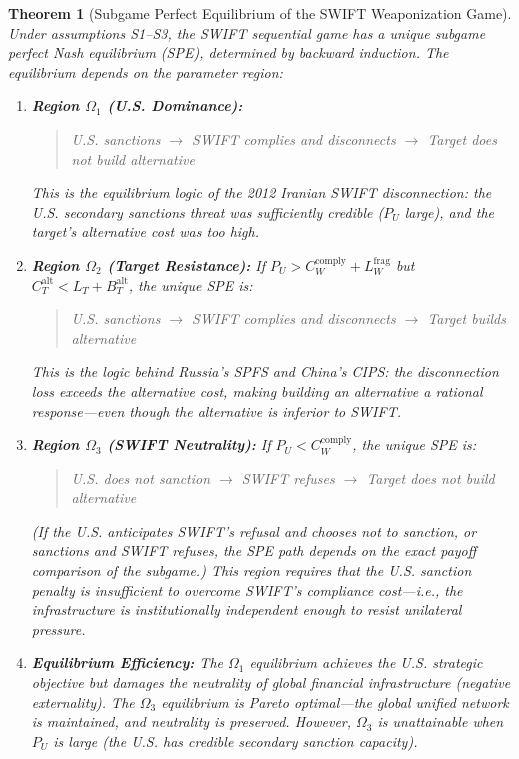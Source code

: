 \documentclass[12pt,a4paper]{ctexart}
\newtheorem{theorem}{Theorem}[section]
\theoremstyle{definition}
\theoremstyle{remark}
\begin{document}
\begin{theorem}[Subgame Perfect Equilibrium of the SWIFT Weaponization Game]
\label{thm:swift-spe}
Under assumptions S1--S3, the SWIFT sequential game has a unique subgame perfect Nash equilibrium (SPE), determined by backward induction. The equilibrium depends on the parameter region:

\begin{enumerate}[label=(
oman*), itemsep=6pt]
\item \textbf{Region $\Omega_1$ (U.S. Dominance):}
\begin{quote}
U.S. sanctions $\to$ SWIFT complies and disconnects $\to$ Target does not build alternative
\end{quote}
This is the equilibrium logic of the 2012 Iranian SWIFT disconnection: the U.S. secondary sanctions threat was sufficiently credible ($P_U$ large), and the target's alternative cost was too high.

\item \textbf{Region $\Omega_2$ (Target Resistance):} If $P_U > C_W^{\text{comply}} + L_W^{\text{frag}}$ but $C_T^{\text{alt}} < L_T + B_T^{\text{alt}}$, the unique SPE is:
\begin{quote}
U.S. sanctions $\to$ SWIFT complies and disconnects $\to$ Target builds alternative
\end{quote}
This is the logic behind Russia's SPFS and China's CIPS: the disconnection loss exceeds the alternative cost, making building an alternative a rational response---even though the alternative is inferior to SWIFT.

\item \textbf{Region $\Omega_3$ (SWIFT Neutrality):} If $P_U < C_W^{\text{comply}}$, the unique SPE is:
\begin{quote}
U.S. does not sanction $\to$ SWIFT refuses $\to$ Target does not build alternative
\end{quote}
(If the U.S. anticipates SWIFT's refusal and chooses not to sanction, or sanctions and SWIFT refuses, the SPE path depends on the exact payoff comparison of the subgame.) This region requires that the U.S. sanction penalty is insufficient to overcome SWIFT's compliance cost---i.e., the infrastructure is institutionally independent enough to resist unilateral pressure.

\item \textbf{Equilibrium Efficiency:} The $\Omega_1$ equilibrium achieves the U.S. strategic objective but damages the neutrality of global financial infrastructure (negative externality). The $\Omega_3$ equilibrium is Pareto optimal---the global unified network is maintained, and neutrality is preserved. However, $\Omega_3$ is unattainable when $P_U$ is large (the U.S. has credible secondary sanction capacity).
\end{enumerate}
\end{theorem}
\end{document}
